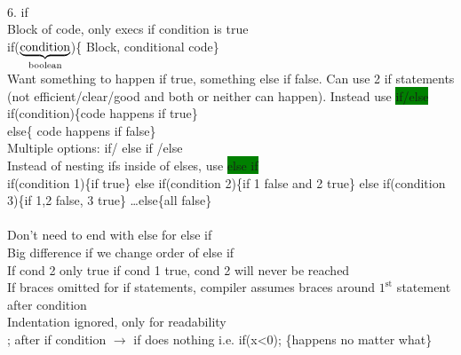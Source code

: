 ~\\ \color{cyan}
6. if
\\ Block of code, only execs if condition is true
\\ if($\underbrace{\textnormal{condition}}_{\textnormal{boolean}}$)\{
Block, conditional code\}
\\ Want something to happen if true, something else if false. Can use 2 if statements (not efficient/clear/good and both or neither can happen). Instead use \colorbox{Green}{if/else}
\\ if(condition)\{code happens if true\}
\\ else\{ code happens if false\}
\\ Multiple options: if/   else if   /else
\\ Instead of nesting ifs inside of elses, use \colorbox{Green}{else if}
\\if(condition 1)\{if true\} else if(condition 2)\{if 1 false and 2 true\} else if(condition 3)\{if 1,2 false, 3 true\} \ldots else\{all false\}
\\
\\ Don't need to end with else for else if
\\ Big difference if we change order of else if
\\ If cond 2 only true if cond 1 true, cond 2 will never be reached
\\ If braces omitted for if statements, compiler assumes braces around $1^{\text{st}}$ statement after condition
\\ Indentation ignored, only for readability 
\\ ; after if condition $\rightarrow$ if does nothing i.e. if(x<0); \{happens no matter what\}